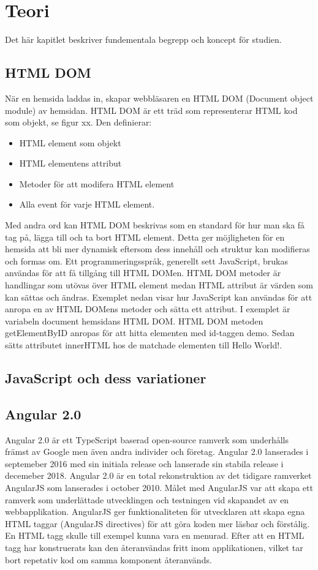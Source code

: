 \section{Teori}
\label{sec:axel-theory}
Det här kapitlet beskriver fundementala begrepp och koncept för studien.

\subsection{HTML DOM}
När en hemsida laddas in, skapar webbläsaren en HTML DOM (Document object module) av hemsidan. HTML DOM är ett träd som representerar HTML kod som objekt, se figur xx. Den definierar:
\begin{itemize}
\item HTML element som objekt
\item HTML elementens attribut
\item Metoder för att modifera HTML element
\item Alla event för varje HTML element.
\end{itemize} 
Med andra ord kan HTML DOM beskrivas som en standard för hur man ska få tag på, lägga till och ta bort HTML element. Detta ger möjligheten för en hemsida att bli mer dynamisk eftersom dess innehåll och struktur kan modifieras och formas om. Ett programmeringsspråk, generellt sett JavaScript, brukas användas för att få tillgång till HTML DOMen. HTML DOM metoder är handlingar som utövas över HTML element medan HTML attribut är värden som kan sättas och ändras. Exemplet nedan visar hur JavaScript kan användas för att anropa en av HTML DOMens metoder och sätta ett attribut. I exemplet är variabeln document hemsidans HTML DOM. HTML DOM metoden getElementByID anropas för att hitta elementen med id-taggen demo. Sedan sätts attributet innerHTML hos de matchade elementen till Hello World!. 


\subsection{JavaScript och dess variationer}


\subsection{Angular 2.0}
Angular 2.0 är ett TypeScript baserad open-source ramverk som underhålls främst av Google men även andra individer och företag. Angular 2.0 lanserades i septemeber 2016 med sin initiala release och lanserade sin stabila release i decemeber 2018. Angular 2.0 är en total rekonstruktion av det tidigare ramverket AngularJS som lanserades i october 2010. Målet med AngularJS var att skapa ett ramverk som underlättade utvecklingen och testningen vid skapandet av en webbapplikation. AngularJS ger funktionaliteten för utvecklaren att skapa egna HTML taggar (AngularJS directives) för att göra koden mer läsbar och förstålig. En HTML tagg skulle till exempel kunna vara en menurad. Efter att en HTML tagg har konstruerats kan den återanvändas fritt inom applikationen, vilket tar bort repetativ kod om samma komponent återanvänds. 

